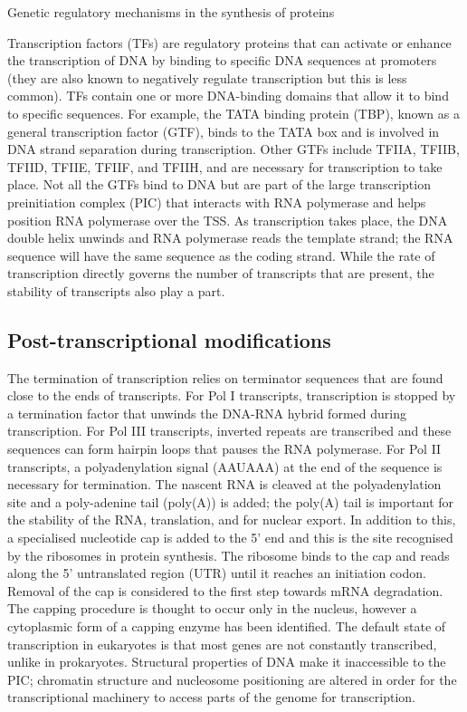 Genetic regulatory mechanisms in the synthesis of proteins\cite{pmid13718526}

Transcription factors (TFs) are regulatory proteins that can activate or enhance the transcription of DNA by binding to specific DNA sequences at promoters (they are also known to negatively regulate transcription but this is less common). TFs contain one or more DNA-binding domains that allow it to bind to specific sequences. For example, the TATA binding protein (TBP), known as a general transcription factor (GTF), binds to the TATA box and is involved in DNA strand separation during transcription. Other GTFs include TFIIA, TFIIB, TFIID, TFIIE, TFIIF, and TFIIH, and are necessary for transcription to take place. Not all the GTFs bind to DNA but are part of the large transcription preinitiation complex (PIC) that interacts with RNA polymerase and helps position RNA polymerase over the TSS. As transcription takes place, the DNA double helix unwinds and RNA polymerase reads the template strand; the RNA sequence will have the same sequence as the coding strand. While the rate of transcription directly governs the number of transcripts that are present, the stability of transcripts also play a part.

\subsection{Post-transcriptional modifications}

The termination of transcription relies on terminator sequences that are found close to the ends of transcripts. For Pol I transcripts, transcription is stopped by a termination factor that unwinds the DNA-RNA hybrid formed during transcription. For Pol III transcripts, inverted repeats are transcribed and these sequences can form hairpin loops that pauses the RNA polymerase. For Pol II transcripts, a polyadenylation signal (AAUAAA) at the end of the sequence is necessary for termination\cite{pmid3479794}. The nascent RNA is cleaved at the polyadenylation site and a poly-adenine tail (poly(A)) is added; the poly(A) tail is important for the stability of the RNA, translation, and for nuclear export. In addition to this, a specialised nucleotide cap is added to the 5' end and this is the site recognised by the ribosomes in protein synthesis. The ribosome binds to the cap and reads along the 5' untranslated region (UTR) until it reaches an initiation codon. Removal of the cap is considered to the first step towards mRNA degradation. The capping procedure is thought to occur only in the nucleus, however a cytoplasmic form of a capping enzyme has been identified\cite{pmid22921400}. The default state of transcription in eukaryotes is that most genes are not constantly transcribed, unlike in prokaryotes. Structural properties of DNA make it inaccessible to the PIC; chromatin structure and nucleosome positioning are altered in order for the transcriptional machinery to access parts of the genome for transcription.

